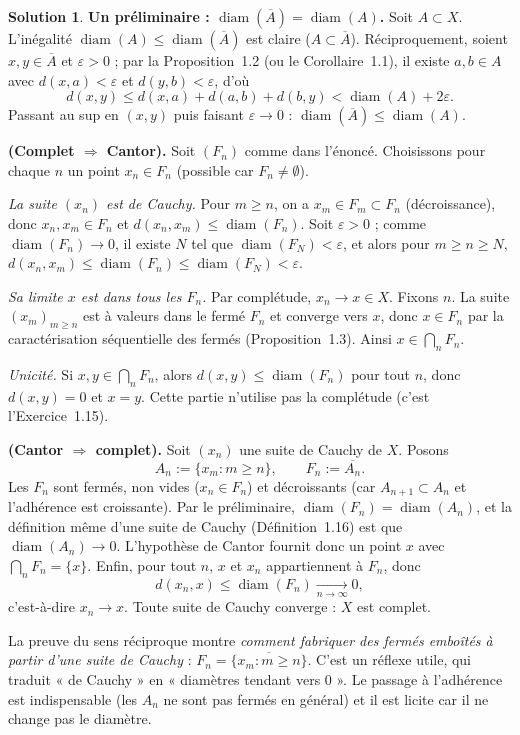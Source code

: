 \documentclass[11pt,a4paper]{article}
\newcommand{\adh}[1]{\overline{#1}}
\newcommand{\diam}{\operatorname{diam}}
\newcommand{\ie}{c'est-à-dire}
\theoremstyle{definition}
\newtheorem*{solution}{Solution}
\begin{document}
\begin{solution}
\noindent\textbf{Un préliminaire : $\diam(\adh{A})=\diam(A)$.} Soit $A\subset X$. L'inégalité $\diam(A)\le\diam(\adh{A})$ est claire ($A\subset\adh{A}$). Réciproquement, soient $x,y\in\adh{A}$ et $\varepsilon>0$ ; par la Proposition~1.2 (ou le Corollaire~1.1), il existe $a,b\in A$ avec $d(x,a)<\varepsilon$ et $d(y,b)<\varepsilon$, d'où
\[
d(x,y)\le d(x,a)+d(a,b)+d(b,y)< \diam(A)+2\varepsilon .
\]
Passant au sup en $(x,y)$ puis faisant $\varepsilon\to0$ : $\diam(\adh{A})\le\diam(A)$.

\medskip
\noindent\textbf{(Complet $\Rightarrow$ Cantor).} Soit $(F_n)$ comme dans l'énoncé. Choisissons pour chaque $n$ un point $x_n\in F_n$ (possible car $F_n\ne\emptyset$).

\emph{La suite $(x_n)$ est de Cauchy.} Pour $m\ge n$, on a $x_m\in F_m\subset F_n$ (décroissance), donc $x_n,x_m\in F_n$ et $d(x_n,x_m)\le\diam(F_n)$. Soit $\varepsilon>0$ ; comme $\diam(F_n)\to0$, il existe $N$ tel que $\diam(F_N)<\varepsilon$, et alors pour $m\ge n\ge N$, $d(x_n,x_m)\le\diam(F_n)\le\diam(F_N)<\varepsilon$.

\emph{Sa limite $x$ est dans tous les $F_n$.} Par complétude, $x_n\to x\in X$. Fixons $n$. La suite $(x_m)_{m\ge n}$ est à valeurs dans le fermé $F_n$ et converge vers $x$, donc $x\in F_n$ par la caractérisation séquentielle des fermés (Proposition~1.3). Ainsi $x\in\bigcap_nF_n$.

\emph{Unicité.} Si $x,y\in\bigcap_nF_n$, alors $d(x,y)\le\diam(F_n)$ pour tout $n$, donc $d(x,y)=0$ et $x=y$. Cette partie n'utilise pas la complétude (c'est l'Exercice~1.15).

\medskip
\noindent\textbf{(Cantor $\Rightarrow$ complet).} Soit $(x_n)$ une suite de Cauchy de $X$. Posons
\[
A_n:=\{x_m : m\ge n\},\qquad F_n:=\adh{A_n}.
\]
Les $F_n$ sont fermés, non vides ($x_n\in F_n$) et décroissants (car $A_{n+1}\subset A_n$ et l'adhérence est croissante). Par le préliminaire, $\diam(F_n)=\diam(A_n)$, et la définition même d'une suite de Cauchy (Définition~1.16) est que $\diam(A_n)\to0$. L'hypothèse de Cantor fournit donc un point $x$ avec $\bigcap_nF_n=\{x\}$. Enfin, pour tout $n$, $x$ et $x_n$ appartiennent à $F_n$, donc
\[
d(x_n,x)\le\diam(F_n)\xrightarrow[n\to\infty]{}0 ,
\]
\ie{} $x_n\to x$. Toute suite de Cauchy converge : $X$ est complet.
\end{solution}

\begin{pointcle}
La preuve du sens réciproque montre \emph{comment fabriquer des fermés emboîtés à partir d'une suite de Cauchy} : $F_n=\adh{\{x_m:m\ge n\}}$. C'est un réflexe utile, qui traduit « de Cauchy » en « diamètres tendant vers $0$ ». Le passage à l'adhérence est indispensable (les $A_n$ ne sont pas fermés en général) et il est licite car il ne change pas le diamètre.
\end{pointcle}
\end{document}
